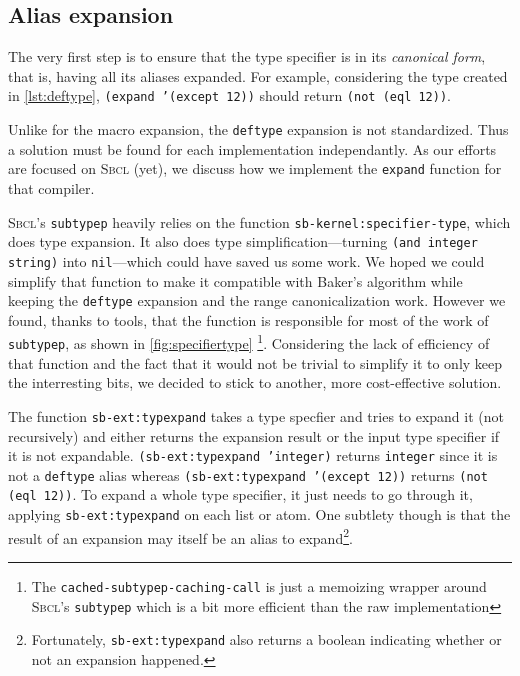 \documentclass[format=sigconf]{acmart}
\newcommand\code[2][\small]{\sloppy\texttt{#1#2}}
\newcommand\footcode[1]{\code[\scriptsize]{#1}}
\theoremstyle{definition}
\newcommand\sbcl{\textsc{Sbcl}}
\begin{document}
\subsection{Alias expansion}
The very first step is to ensure that the type specifier is in its
\emph{canonical form}, that is, having all its aliases expanded. For example,
considering the type created in \vref{lst:deftype},
\code{(expand '(except 12))} should return \code{(not (eql 12))}.

Unlike for the macro expansion, the \code{deftype} expansion is not
standardized. Thus a solution must be found for each implementation
independantly. As our efforts are focused on \sbcl{} (yet), we discuss how we
implement the \code{expand} function for that compiler.

\sbcl's \code{subtypep} heavily relies on the function
\code{sb-kernel:specifier-type}, which does type expansion. It also does
type simplification---turning \code{(and integer string)} into
\code{nil}---which could have saved us some work. We hoped we could simplify
that function to make it compatible with Baker's algorithm while keeping the
\code{deftype} expansion and the range canonicalization work. However we found,
thanks to \cite{newton.18.phd} tools, that the function is responsible for most
of the work of \code{subtypep}, as shown in \vref{fig:specifiertype}
\footnote{The \footcode{cached-subtypep-caching-call} is just a memoizing wrapper
  around \sbcl's \footcode{subtypep} which is a bit more efficient than the raw
  implementation}.
Considering the lack of efficiency of that function and the fact that it would
not be trivial to simplify it to only keep the interresting bits, we decided to
stick to another, more cost-effective solution.

The function \code{sb-ext:typexpand} takes a type specfier and tries to expand
it (not recursively) and either returns the expansion result or the input type
specifier if it is not expandable. \code{(sb-ext:typexpand 'integer)} returns
\code{integer} since it is not a \code{deftype} alias whereas
\code{(sb-ext:typexpand '(except 12))} returns \code{(not (eql 12))}.
To expand a whole type specifier, it just needs to go through it, applying
\code{sb-ext:typexpand} on each list or atom. One subtlety though is that the
result of an expansion may itself be an alias to expand\footnote{Fortunately,
  \footcode{sb-ext:typexpand} also returns a boolean indicating whether or not
  an expansion happened.}.
\end{document}

